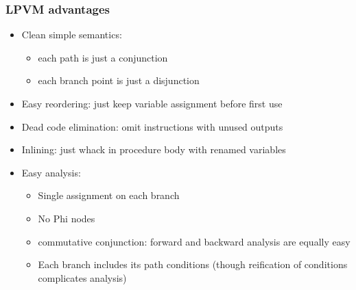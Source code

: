 \documentclass[12pt]{beamer}
\begin{document}
\begin{frame}[fragile]
\frametitle{LPVM advantages}
\begin{itemize}
\item Clean simple semantics:
  \begin{itemize}
  \item each path is just a conjunction
  \item each branch point is just a disjunction
  \end{itemize}
\item Easy reordering:  just keep variable assignment before first use
\item Dead code elimination: omit instructions with unused outputs
\item Inlining:  just whack in procedure body with renamed variables
\item Easy analysis:
  \begin{itemize}
  \item Single assignment on each branch
  \item No Phi nodes
  \item commutative conjunction:
    forward and backward analysis are equally easy
  \item Each branch includes its path conditions (though reification of
    conditions complicates analysis)
  \end{itemize}
\end{itemize}
\end{frame}
\end{document}
